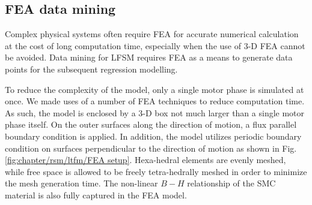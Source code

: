         \subsection{\acs{FEA} data mining}          \label{Chapter:RSM/LTFM/data mining}
        
        
            Complex physical systems often require \acs{FEA} for accurate numerical calculation at the cost of long computation time, especially when the use of 3-D \acs{FEA} cannot be avoided. Data mining for \acs{LFSM} requires FEA as a means to generate data points for the subsequent regression modelling. 
            
            
            To reduce the complexity of the model, only a single motor phase is simulated at once. We made uses of a number of \acs{FEA} techniques to reduce computation time. As such, the model is enclosed by a 3-D box not much larger than a single motor phase itself. On the outer surfaces along the direction of motion, a flux parallel boundary condition is applied. In addition, the model utilizes periodic boundary condition on surfaces perpendicular to the direction of motion as shown in Fig.\,\ref{fig:chapter/rsm/ltfm/FEA setup}. Hexa-hedral elements are evenly meshed, while free space is allowed to be freely tetra-hedrally meshed in order to minimize the mesh generation time. The non-linear $B-H$ relationship of the \acs{SMC} material is also fully captured in the \acs{FEA} model. 
            
